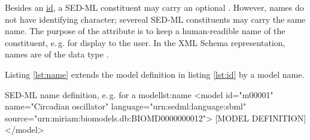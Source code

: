 \label{sec:name}
%

Besides an \hyperref[sec:id]{id}, a SED-ML constituent may carry an optional . However, names do not have identifying character;  severeal SED-ML constituents may carry the same name. The purpose of the  attribute is to keep a human-readible name of the constituent, e.\,g. for display to the user. In the XML Schema representation, names are of the data type .

Listing \ref{lst:name} extends the model definition in listing \ref{lst:id} by a model name.
%
\begin{myXmlLst}{SED-ML name definition, e.\,g. for a model}{lst:name}
<model id="m00001" name="Circadian oscillator" language="urn:sedml:language:sbml" source="urn:miriam:biomodels.db:BIOMD0000000012">
 [MODEL DEFINITION]
</model>
\end{myXmlLst}
%

